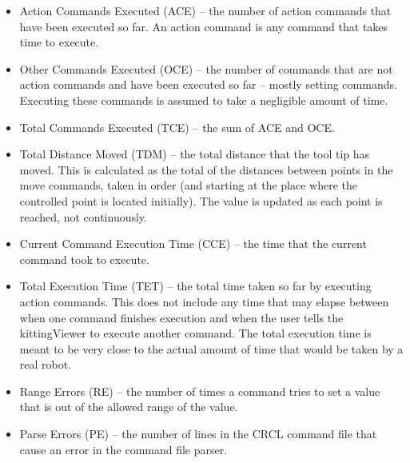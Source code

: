 \begin{itemize}

\item \sf Action Commands Executed (ACE) \rm -- the number of action commands that
  have been executed so far. An action command is any command that takes
  time to execute.\\

\item \sf Other Commands Executed (OCE) \rm -- the number of commands that are
  not action commands and have been executed so far -- mostly setting
  commands. Executing these commands is assumed to take a negligible amount
  of time.\\
   
 \item \sf Total Commands Executed (TCE) \rm -- the sum of ACE and OCE.\\

\item \sf Total Distance Moved (TDM) \rm -- the total distance that the
  tool tip has moved.  This is calculated as the total of the distances between 
  points in
  the move commands, taken in order (and starting at the place where the
  controlled point is located initially). The value is updated as each point
  is reached, not continuously.\\
  
 \item \sf Current Command Execution Time (CCE) \rm -- the time that the current
   command took to execute.\\
   
\item \sf Total Execution Time (TET) \rm -- the total time taken so far by
  executing action commands. This does not include any time that may elapse
  between when one command finishes execution and when the user tells the
  kittingViewer to execute another command. The total execution time is
  meant to be very close to the actual amount of time that would be taken
  by a real robot.\\

\item \sf Range Errors (RE) \rm -- the number of times a command tries to set a
  value that is out of the allowed range of the value.\\

\item \sf Parse Errors  (PE) \rm -- the number of lines in the CRCL command file
  that cause an error in the command file parser. \\


\end{itemize}
